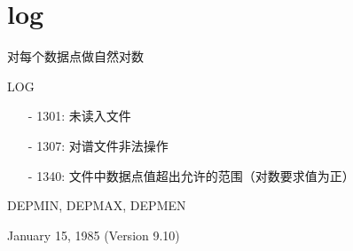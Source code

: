 \section{log}
\label{cmd:log}

对每个数据点做自然对数

LOG

\begin{itemize}
\item[-]1301: 未读入文件
\item[-]1307: 对谱文件非法操作
\item[-]1340: 文件中数据点值超出允许的范围（对数要求值为正）
\end{itemize}

DEPMIN, DEPMAX, DEPMEN

January 15, 1985 (Version 9.10)
